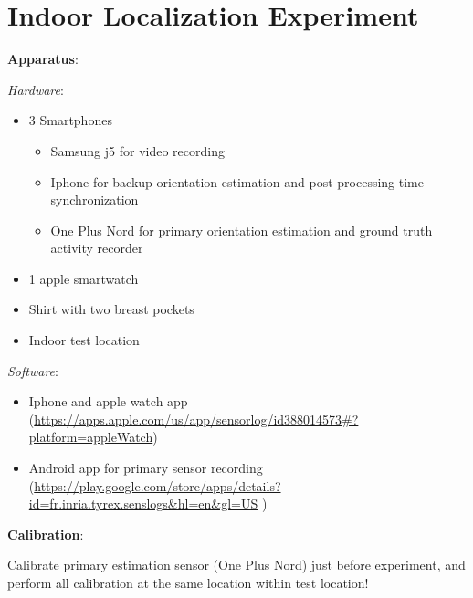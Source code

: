 %
\chapter{Indoor Localization Experiment}
\label{appendix:shs_experiment}
\textbf{Apparatus}:

\emph{Hardware}:

\begin{itemize}
	\item
	3 Smartphones
	
	\begin{itemize}
		\tightlist
		\item
		Samsung j5 for video recording
		\item
		Iphone for backup orientation estimation and post processing time
		synchronization
		\item
		One Plus Nord for primary orientation estimation and ground truth
		activity recorder
	\end{itemize}
	\item
	1 apple smartwatch
	\item
	Shirt with two breast pockets
	\item
	Indoor test location
\end{itemize}

\emph{Software}:

\begin{itemize}
	\tightlist
	\item
	Iphone and apple watch app
	(\url{https://apps.apple.com/us/app/sensorlog/id388014573\#?platform=appleWatch})
	\item
	Android app for primary sensor recording
	(\url{https://play.google.com/store/apps/details?id=fr.inria.tyrex.senslogs\&hl=en\&gl=US}
	)
\end{itemize}

\textbf{Calibration}:

Calibrate primary estimation sensor (One Plus Nord) just before
experiment, and perform all calibration at the same location within test
location!


